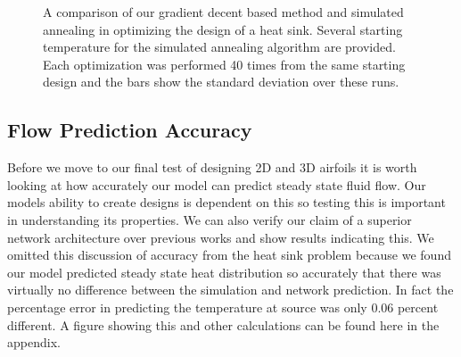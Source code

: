 \documentclass{article} %
\begin{document}
\begin{figure}[!t]
\begin{center}
\end{center}
\label{heat_sink_optimization}
\caption{A comparison of our gradient decent based method and simulated annealing in optimizing the design of a heat sink. Several starting temperature for the simulated annealing algorithm are provided. Each optimization was performed 40 times from the same starting design and the bars show the standard deviation over these runs.}
\end{figure}

\begin{figure}[h]
\begin{center}
\end{center}
\end{figure}


\subsection{Flow Prediction Accuracy}

Before we move to our final test of designing 2D and 3D airfoils it is worth looking at how accurately our model can predict steady state fluid flow. Our models ability to create designs is dependent on this so testing this is important in understanding its properties. We can also verify our claim of a superior network architecture over previous works and show results indicating this. We omitted this discussion of accuracy from the heat sink problem because we found our model predicted steady state heat distribution so accurately that there was virtually no difference between the simulation and network prediction. In fact the percentage error in predicting the temperature at source was only 0.06 percent different. A figure showing this and other calculations can be found here in the appendix.
\end{document}
